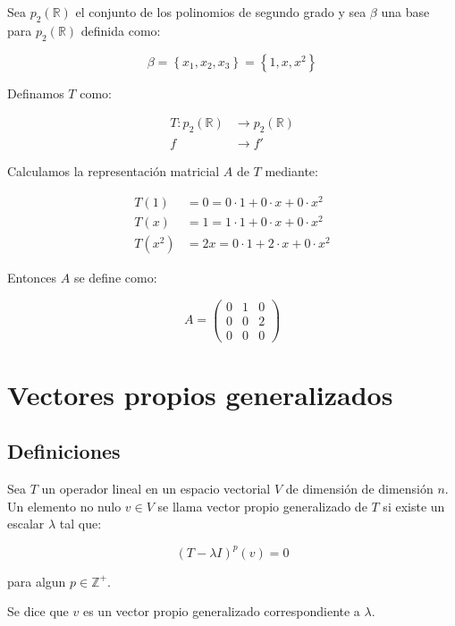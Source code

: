 		\begin{ejemplo}
			Sea $p_2(\mathbb{R})$ el conjunto de los polinomios de segundo grado y sea $\beta$ una base para $p_2(\mathbb{R})$ definida como:

			\begin{equation*}
				\beta = \left\{ x_1, x_2, x_3 \right\} = \left\{ 1, x, x^2 \right\}
			\end{equation*}

			Definamos $T$ como:

			\begin{align*}
				T \colon p_2(\mathbb{R}) &\to p_2(\mathbb{R}) \\
				f &\to f'
			\end{align*}

			Calculamos la representación matricial $A$ de $T$ mediante:

			\begin{align*}
				T(1) &= 0 = 0 \cdot 1 + 0 \cdot x + 0 \cdot x^2 \\
				T(x) &= 1 = 1 \cdot 1 + 0 \cdot x + 0 \cdot x^2 \\
				T(x^2) &= 2x = 0 \cdot 1 + 2 \cdot x + 0 \cdot x^2
			\end{align*}

			Entonces $A$ se define como:

			\begin{equation*}
				A =
				\begin{pmatrix}
					0 & 1 & 0 \\
					0 & 0 & 2 \\
					0 & 0 & 0
				\end{pmatrix}
			\end{equation*}
		\end{ejemplo}

\newpage
\section{Vectores propios generalizados}

	\subsection{Definiciones}

		\begin{definicion}
			Sea $T$ un operador lineal en un espacio vectorial $V$ de dimensión de dimensión $n$. Un elemento no nulo $v \in V$ se llama vector propio generalizado de $T$ si existe un escalar $\lambda$ tal que:

			\begin{equation}
				(T - \lambda I)^p(v) = 0
			\end{equation}

			para algun $p \in \mathbb{Z}^+$.

			Se dice que $v$ es un vector propio generalizado correspondiente a $\lambda$.
		\end{definicion}

